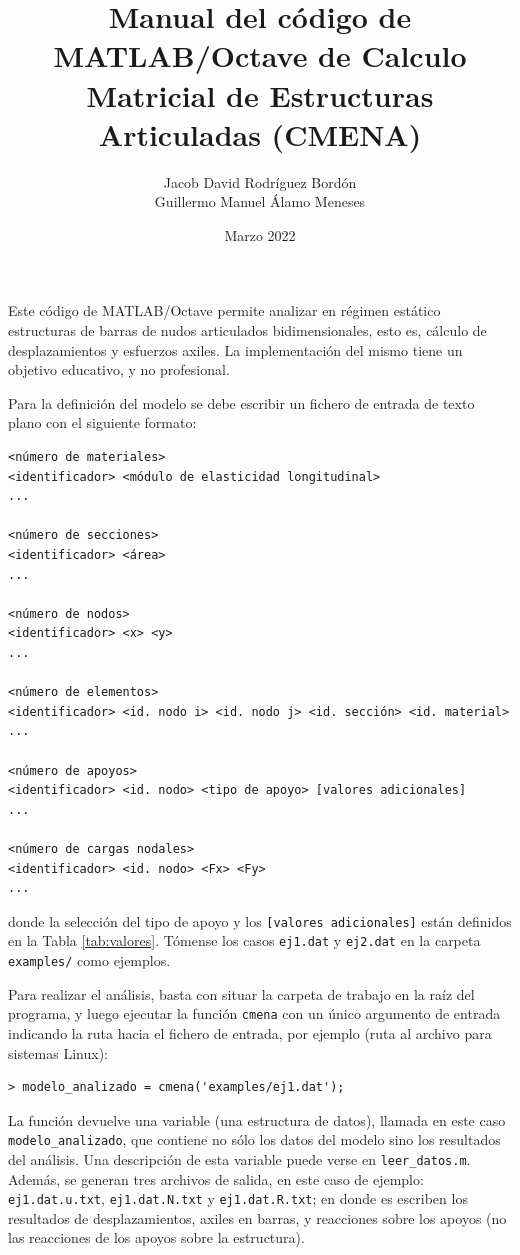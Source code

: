 \documentclass[a4paper,11pt]{article}
\title{Manual del código de MATLAB/Octave de Calculo Matricial de Estructuras Articuladas (CMENA)}
\author{Jacob David Rodr\'iguez Bord\'on \\ Guillermo Manuel \'Alamo Meneses}
\date{Marzo 2022}
\begin{document}
\maketitle

Este código de MATLAB/Octave permite analizar en régimen estático estructuras de barras de nudos articulados bidimensionales, esto es, cálculo de desplazamientos y esfuerzos axiles. La implementación del mismo tiene un objetivo educativo, y no profesional.

Para la definición del modelo se debe escribir un fichero de entrada de texto plano con el siguiente formato:
\begin{Verbatim}[frame=single,fontsize=\small]
<número de materiales>
<identificador> <módulo de elasticidad longitudinal>
...

<número de secciones>
<identificador> <área>
...

<número de nodos>
<identificador> <x> <y>
...

<número de elementos>
<identificador> <id. nodo i> <id. nodo j> <id. sección> <id. material>
...

<número de apoyos>
<identificador> <id. nodo> <tipo de apoyo> [valores adicionales]
...

<número de cargas nodales>
<identificador> <id. nodo> <Fx> <Fy>
...

\end{Verbatim}
donde la selección del tipo de apoyo y los \texttt{[valores adicionales]} están definidos en la Tabla \ref{tab:valores}. Tómense los casos \texttt{ej1.dat} y \texttt{ej2.dat} en la carpeta \texttt{examples/} como ejemplos.

Para realizar el análisis, basta con situar la carpeta de trabajo en la raíz del programa, y luego ejecutar la función \texttt{cmena} con un único argumento de entrada indicando la ruta hacia el fichero de entrada, por ejemplo (ruta al archivo para sistemas Linux):
\begin{Verbatim}[frame=single,fontsize=\small]
> modelo_analizado = cmena('examples/ej1.dat');
\end{Verbatim}
La función devuelve una variable (una estructura de datos), llamada en este caso \texttt{modelo\_analizado}, que contiene no sólo los datos del modelo sino los resultados del análisis. Una descripción de esta variable puede verse en \texttt{leer\_datos.m}. Además, se generan tres archivos de salida, en este caso de ejemplo: \texttt{ej1.dat.u.txt}, \texttt{ej1.dat.N.txt} y \texttt{ej1.dat.R.txt}; en donde es escriben los resultados de desplazamientos, axiles en barras, y reacciones sobre los apoyos (no las reacciones de los apoyos sobre la estructura).
\end{document}
